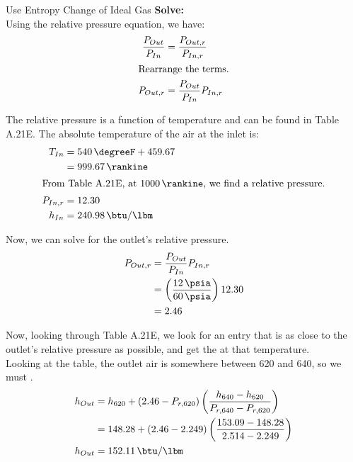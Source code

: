 \begin{example}{Use Entropy Change of Ideal Gas}
  \textbf{Solve:} \\
  Using the relative pressure equation, we have:
  \begin{align*}
    \frac{P_{Out}}{P_{In}} &= \frac{P_{Out, r}}{P_{In, r}} \\
    \shortintertext{Rearrange the terms.}
    P_{Out, r} &= \frac{P_{Out}}{P_{In}} P_{In, r}
  \end{align*}

  The relative pressure is a function of temperature and can be found in Table A.21E.
  The absolute temperature of the air at the inlet is:
  \begin{align*}
    \Temp_{In} &= \SI{540}{\degreeF} + 459.67 \\
               &= \SI{999.67}{\rankine} \\
    \intertext{From Table A.21E, at \SI{1000}{\rankine}, we find a relative pressure.}
    \Pressure_{In, \Relative} &= 12.30 \\
    \SpecificEnthalpy_{In} &= \SI{240.98}{\btu\per\lbm}
  \end{align*}

  Now, we can solve for the outlet's relative pressure.
  \begin{align*}
    \Pressure_{Out, \Relative} &= \frac{\Pressure_{Out}}{\Pressure_{In}} \Pressure_{In, \Relative} \\
                               &= \left( \frac{\SI{12}{\psia}}{\SI{60}{\psia}} \right) 12.30 \\
                               &= 2.46
  \end{align*}

  Now, looking through Table A.21E, we look for an entry that is as close to the outlet's relative pressure as possible, and get the  at that temperature. \\
  Looking at the table, the outlet air is somewhere between \SI{620}{\rankine} and \SI{640}{\rankine}, so we must .
  \begin{align*}
    \SpecificEnthalpy_{Out} &= \SpecificEnthalpy_{620} + (2.46 - \Pressure_{\Relative, 620}) \left( \frac{\SpecificEnthalpy_{640} - \SpecificEnthalpy_{620}}{\Pressure_{\Relative, 640} - \Pressure_{\Relative, 620}} \right) \\
                          &= 148.28 + (2.46 - 2.249) \left( \frac{153.09 - 148.28}{2.514 - 2.249} \right) \\
    \SpecificEnthalpy_{Out} &= \SI{152.11}{\btu\per\lbm}
  \end{align*}


\end{example}
